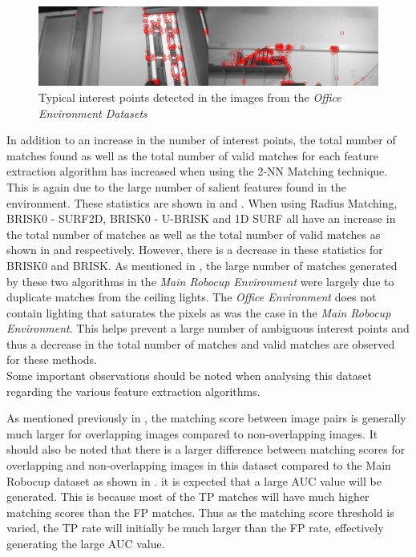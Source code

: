 \documentclass[11pt]{report}
\begin{document}
\begin{figure}
  \centering
    \includegraphics[width=1.0\textwidth]{../Drawings/Matching/dataset2_interestPoints.jpg}
    \caption{Typical interest points detected in the images from the \textit{Office Environment Datasets}} 
    \label{fig:oe_interestPoints}
\end{figure}


In addition to an increase in the number of interest points, the total number of matches found as well as the total number of valid matches for each feature extraction algorithm has increased when using the 2-NN Matching technique. This is again due to the large number of salient features found in the environment. These statistics are shown in  and . When using Radius Matching, BRISK0 - SURF2D, BRISK0 - U-BRISK and 1D SURF all have an increase in the total number of matches as well as the total number of valid matches as shown in  and  respectively. However, there is a decrease in these statistics for BRISK0 and BRISK. As mentioned in , the large number of matches generated by these two algorithms in the \textit{Main Robocup Environment} were largely due to duplicate matches from the ceiling lights. The \textit{Office Environment} does not contain lighting that saturates the pixels as was the case in the \textit{Main Robocup Environment}. This helps prevent a large number of ambiguous interest points and thus a decrease in the total number of matches and valid matches are observed for these methods.\\ 


Some important observations should be noted when analysing this dataset regarding the various feature extraction algorithms. 

As mentioned previously in , the matching score between image pairs is generally much larger for overlapping images compared to non-overlapping images. It should also be noted that there is a larger difference between matching scores for overlapping and non-overlapping images in this dataset compared to the Main Robocup dataset as shown in . it is expected that a large AUC value will be generated. This is because most of the TP matches will have much higher matching scores than the FP matches. Thus as the matching score threshold is varied, the TP rate will initially be much larger than the FP rate, effectively generating the large AUC value. \\
\end{document}
